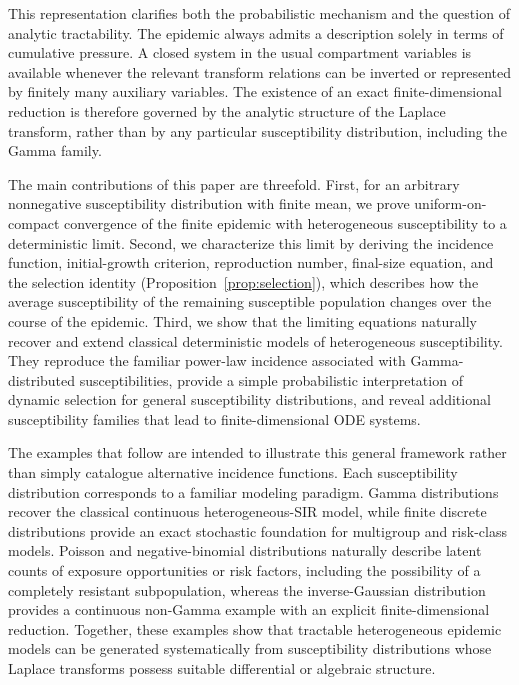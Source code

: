 \documentclass[pdflatex,sn-mathphys-ay]{sn-jnl}
\theoremstyle{thmstyleone}
\theoremstyle{thmstyletwo}
\theoremstyle{thmstylethree}
\begin{document}
This representation clarifies both the probabilistic mechanism and the
question of analytic tractability. The epidemic always admits a 
description solely in terms of cumulative pressure. A closed system in the usual
compartment variables is available whenever the relevant transform relations
can be inverted or represented by finitely many auxiliary variables. The existence of an exact finite-dimensional reduction is therefore governed by the analytic structure of the Laplace transform, rather than by any particular susceptibility distribution, including the Gamma family.

The main contributions of this paper are threefold. First, for an arbitrary
nonnegative susceptibility distribution with finite mean, we prove
uniform-on-compact convergence of the finite  epidemic with heterogeneous susceptibility to a
deterministic limit. Second, we characterize this limit by deriving the
incidence function, initial-growth criterion, reproduction number, final-size
equation, and the selection identity (Proposition~\ref{prop:selection}), which
describes how the average susceptibility of the remaining susceptible
population changes over the course of the epidemic. Third, we show that the
limiting equations naturally recover and extend classical deterministic models
of heterogeneous susceptibility. They reproduce the familiar power-law
incidence associated with Gamma-distributed susceptibilities, provide a simple
probabilistic interpretation of dynamic selection for general susceptibility
distributions, and reveal additional susceptibility families that lead to
finite-dimensional ODE systems.

The examples that follow are intended to illustrate this general framework
rather than simply catalogue alternative incidence functions. Each
susceptibility distribution corresponds to a familiar modeling paradigm.
Gamma distributions recover the classical continuous heterogeneous-SIR model,
while finite discrete distributions provide an exact stochastic foundation for
multigroup and risk-class models. Poisson and negative-binomial distributions
naturally describe latent counts of exposure opportunities or risk factors,
including the possibility of a completely resistant subpopulation, whereas the
inverse-Gaussian distribution provides a continuous non-Gamma example with an
explicit finite-dimensional reduction. Together, these examples show that
tractable heterogeneous epidemic models can be generated systematically from
susceptibility distributions whose Laplace transforms possess suitable
differential or algebraic structure.
\end{document}
